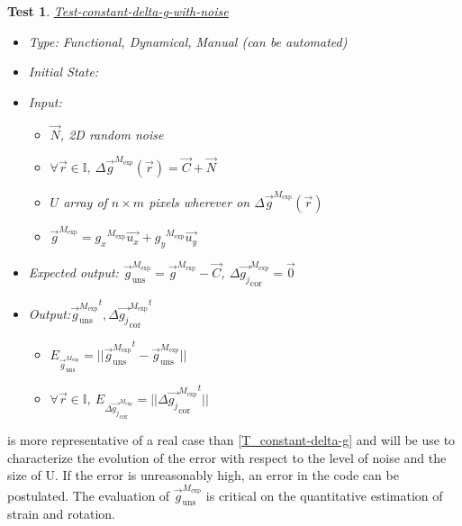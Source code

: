 \documentclass[12pt, titlepage]{article}
\newtheorem{Test}{Test}
\begin{document}
\begin{Test}\normalfont\underline{Test-constant-delta-g-with-noise}
\label{T_constant-delta-g-with-noise}
\begin{itemize}
\item Type: Functional, Dynamical, Manual (can be automated)
\item Initial State: 
\item Input: 
	\begin{itemize}
	\item $\overrightarrow{N}$, 2D random noise
	\item $\forall \vec{r} \in \mathbb{I}, \ \Delta \overrightarrow{g}^{M_{\text{exp}}}(\vec{r})=\overrightarrow{C} + \overrightarrow{N}$
	\item $U$ array of $n \times m$ pixels wherever on $\Delta \overrightarrow{g}^{M_{\text{exp}}}(\vec{r})$ 
	\item $\overrightarrow{g}^{M_{\text{exp}}}={g_x}^{M_{\text{exp}}}\overrightarrow{u_x}+{g_y}^{M_{\text{exp}}}\overrightarrow{u_y}$
	\end{itemize}
\item Expected output: $\overrightarrow{g}_{\text{uns}}^{M_{\text{exp}}}=\overrightarrow{g}^{M_{\text{exp}}}-\overrightarrow{C}$,  $\Delta\overrightarrow{g_{j}}_{\text{cor}}^{M_{\text{exp}}}=\overrightarrow{0}$
\item Output:${\overrightarrow{g}_{\text{uns}}^{M_{\text{exp}}}}^{t}, {\Delta\overrightarrow{g_{j}}_{\text{cor}}^{M_{\text{exp}}}}^{t}$
	\begin{itemize}
	\item $E_{\overrightarrow{g}_{\text{uns}}^{M_{\text{exp}}}}=||{\overrightarrow{g}_{\text{uns}}^{M_{\text{exp}}}}^{t}-\overrightarrow{g}_{\text{uns}}^{M_{\text{exp}}}||$
	\item $\forall \vec{r} \in \mathbb{I}, \ E_{\Delta\overrightarrow{g_{j}}_{\text{cor}}^{M_{\text{exp}}}}=||{\Delta\overrightarrow{g_{j}}_{\text{cor}}^{M_{\text{exp}}}}^{t}||$
	\end{itemize}
\end{itemize}
\end{Test}

 is more representative of a real
case than \cref{T_constant-delta-g} and will be use to characterize
the evolution of the error with respect to the level of noise and the
size of U. If the error is unreasonably high, an error in the code can
be postulated. The evaluation of
$\overrightarrow{g}_{\text{uns}}^{M_{\text{exp}}}$ is critical on the
quantitative estimation of strain and rotation.  
\end{document}
